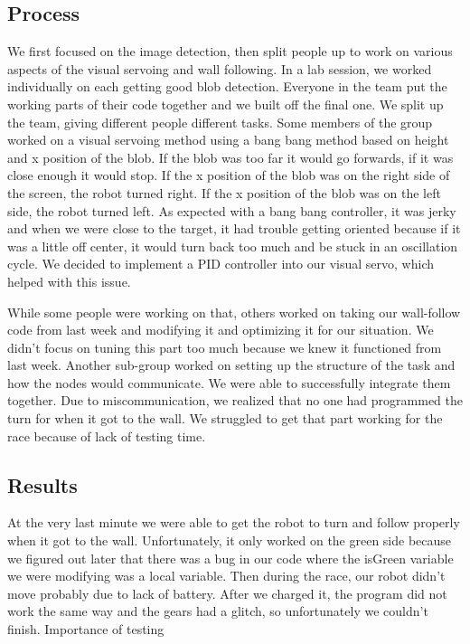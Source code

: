 \documentclass[journal, a4paper]{IEEEtran}
\begin{document}
\subsection{Process}
\par We first focused on the image detection, then split people up to work on various aspects of the visual servoing and wall following. In a lab session, we worked individually on each getting good blob detection. Everyone in the team put the working parts of their code together and we built off the final one. We split up the team, giving different people different tasks. Some members of the group worked on a visual servoing method using a bang bang method based on height and x position of the blob. If the blob was too far it would go forwards, if it was close enough it would stop. If the x position of the blob was on the right side of the screen, the robot turned right. If the x position of the blob was on the left side, the robot turned left. As expected with a bang bang controller, it was jerky and when we were close to the target, it had trouble getting oriented because if it was a little off center, it would turn back too much and be stuck in an oscillation cycle. We decided to implement a PID controller into our visual servo, which helped with this issue. 
\par While some people were working on that, others worked on taking our wall-follow code from last week and modifying it and optimizing it for our situation. We didn’t focus on tuning this part too much because we knew it functioned from last week. Another sub-group worked on setting up the structure of the task and how the nodes would communicate. We were able to successfully integrate them together. Due to miscommunication, we realized that no one had programmed the turn for when it got to the wall. We struggled to get that part working for the race because of lack of testing time. 
\subsection{Results}
At the very last minute we were able to get the robot to turn and follow properly when it got to the wall. Unfortunately, it only worked on the green side because we figured out later that there was a bug in our code where the isGreen variable we were modifying was a local variable. Then during the race, our robot didn’t move probably due to lack of battery. After we charged it, the program did not work the same way and the gears had a glitch, so unfortunately we couldn’t finish. Importance of testing
\end{document}
